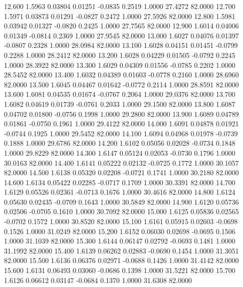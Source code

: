   12.600   1.5963   0.03804   0.01251  -0.0835   0.2519   1.0000  27.4272  82.0000
  12.700   1.5971   0.03873   0.01291  -0.0827   0.2472   1.0000  27.5926  82.0000
  12.800   1.5981   0.03942   0.01327  -0.0820   0.2425   1.0000  27.7565  82.0000
  12.900   1.6014   0.04006   0.01349  -0.0814   0.2369   1.0000  27.9545  82.0000
  13.000   1.6027   0.04076   0.01397  -0.0807   0.2328   1.0000  28.0984  82.0000
  13.100   1.6028   0.04151   0.01451  -0.0799   0.2288   1.0000  28.2412  82.0000
  13.200   1.6028   0.04229   0.01505  -0.0792   0.2245   1.0000  28.3922  82.0000
  13.300   1.6029   0.04309   0.01556  -0.0785   0.2202   1.0000  28.5452  82.0000
  13.400   1.6032   0.04389   0.01603  -0.0778   0.2160   1.0000  28.6960  82.0000
  13.500   1.6045   0.04467   0.01642  -0.0772   0.2114   1.0000  28.8591  82.0000
  13.600   1.6081   0.04535   0.01674  -0.0767   0.2064   1.0000  29.0376  82.0000
  13.700   1.6082   0.04619   0.01739  -0.0761   0.2033   1.0000  29.1500  82.0000
  13.800   1.6087   0.04702   0.01800  -0.0756   0.1998   1.0000  29.2800  82.0000
  13.900   1.6089   0.04789   0.01861  -0.0750   0.1961   1.0000  29.4122  82.0000
  14.000   1.6091   0.04878   0.01921  -0.0744   0.1925   1.0000  29.5452  82.0000
  14.100   1.6094   0.04968   0.01978  -0.0739   0.1888   1.0000  29.6786  82.0000
  14.200   1.6102   0.05056   0.02028  -0.0734   0.1848   1.0000  29.8229  82.0000
  14.300   1.6147   0.05124   0.02053  -0.0730   0.1796   1.0000  30.0163  82.0000
  14.400   1.6141   0.05222   0.02132  -0.0725   0.1772   1.0000  30.1057  82.0000
  14.500   1.6138   0.05320   0.02208  -0.0721   0.1741   1.0000  30.2180  82.0000
  14.600   1.6134   0.05422   0.02285  -0.0717   0.1709   1.0000  30.3391  82.0000
  14.700   1.6129   0.05526   0.02361  -0.0713   0.1676   1.0000  30.4616  82.0000
  14.800   1.6124   0.05630   0.02435  -0.0709   0.1643   1.0000  30.5849  82.0000
  14.900   1.6120   0.05736   0.02506  -0.0705   0.1610   1.0000  30.7092  82.0000
  15.000   1.6125   0.05836   0.02565  -0.0702   0.1572   1.0000  30.8520  82.0000
  15.100   1.6161   0.05915   0.02603  -0.0698   0.1526   1.0000  31.0249  82.0000
  15.200   1.6152   0.06030   0.02698  -0.0695   0.1506   1.0000  31.1039  82.0000
  15.300   1.6144   0.06147   0.02792  -0.0693   0.1481   1.0000  31.1992  82.0000
  15.400   1.6139   0.06262   0.02883  -0.0690   0.1454   1.0000  31.3051  82.0000
  15.500   1.6136   0.06376   0.02971  -0.0688   0.1426   1.0000  31.4142  82.0000
  15.600   1.6131   0.06493   0.03060  -0.0686   0.1398   1.0000  31.5221  82.0000
  15.700   1.6126   0.06612   0.03147  -0.0684   0.1370   1.0000  31.6308  82.0000
